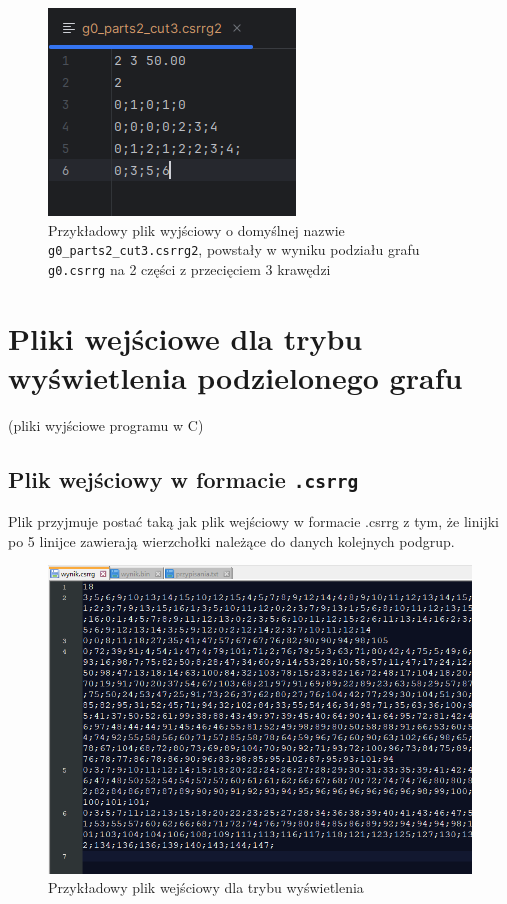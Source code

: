 \documentclass{article}
\begin{document}
    \begin{figure}[H]
        \centering
        \includegraphics[width=0.75\linewidth]{img/output.png}
        \caption{Przykładowy plik wyjściowy o domyślnej nazwie \texttt{g0\_parts2\_cut3.csrrg2}, powstały w wyniku podziału grafu \texttt{g0.csrrg} na 2 części z przecięciem 3 krawędzi}
        \label{fig:output}
    \end{figure}

    


\section{Pliki wejściowe dla trybu wyświetlenia podzielonego grafu}
    (pliki wyjściowe programu w C)

    \subsection{Plik wejściowy w formacie \texttt{.csrrg}}
    Plik przyjmuje postać taką jak plik wejściowy w formacie .csrrg z tym, że linijki po 5 linijce zawierają wierzchołki należące do danych kolejnych podgrup.
    \begin{figure}[H]
        \centering
        \includegraphics[width=0.9\linewidth]{img/plik_c.png}
        \caption{Przykładowy plik wejściowy dla trybu wyświetlenia}
        \label{fig:plik_c}
    \end{figure}
\end{document}
